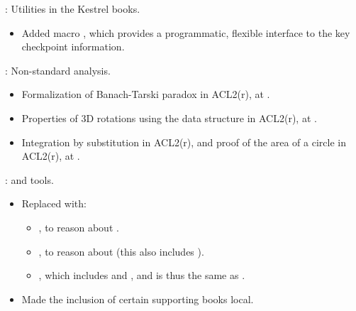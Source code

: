 
\begin{frame}

\implibtitle

:
Utilities in the Kestrel books.
\begin{itemize}
\item Added macro ,
      which provides a programmatic, flexible interface
      to the key checkpoint information.
\end{itemize}

\end{frame}


\begin{frame}

\implibtitle

:
Non-standard analysis.
\begin{itemize}
\item Formalization of Banach-Tarski paradox in ACL2(r),
      at .
\item Properties of 3D rotations
      using the  data structure in ACL2(r),
      at .
\item Integration by substitution in ACL2(r),
      and proof of the area of a circle in ACL2(r),
      at .
\end{itemize}

\end{frame}


\begin{frame}

\implibtitle

:
 and  tools.
\begin{itemize}
\item Replaced  with:
      \begin{itemize}
      \item {}, to reason about .
      \item {}, to reason about 
            (this also includes ).
      \item {},
            which includes  and ,
            and is thus the same as .
      \end{itemize}
\item Made the inclusion of certain supporting books local.
\end{itemize}

\end{frame}

